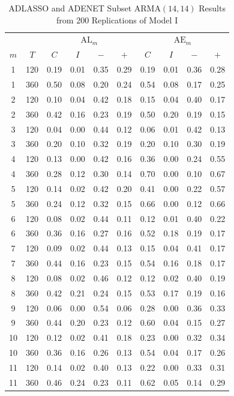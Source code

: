 \begin{table}[ht!]
\footnotesize
\centering
\caption{ADLASSO and ADENET Subset ARMA$(14,14)$ Results from 200 Replications of Model I}
\begin{tabular}{cc|cccc|cccc}
  \hline
  & & \multicolumn{4}{c|}{$\textrm{AL}_m$} & \multicolumn{4}{c}{$\textrm{AE}_m$} \\
  \cline{4-5}  \cline{8-9}
  $m$ & $T$ & $C$ & $I$ & $-$ & $+$ & $C$ & $I$ & $-$ & $+$ \\
  \hline
  1 & 120 & 0.19 & 0.01 & 0.35 & 0.29 & 0.19 & 0.01 & 0.36 & 0.28 \\ 
  1 & 360 & 0.50 & 0.08 & 0.20 & 0.24 & 0.54 & 0.08 & 0.17 & 0.25 \\ 
  2 & 120 & 0.10 & 0.04 & 0.42 & 0.18 & 0.15 & 0.04 & 0.40 & 0.17 \\ 
  2 & 360 & 0.42 & 0.16 & 0.23 & 0.19 & 0.50 & 0.20 & 0.19 & 0.15 \\ 
  3 & 120 & 0.04 & 0.00 & 0.44 & 0.12 & 0.06 & 0.01 & 0.42 & 0.13 \\ 
  3 & 360 & 0.20 & 0.10 & 0.32 & 0.19 & 0.20 & 0.10 & 0.30 & 0.19 \\
  	\hline 
  4 & 120 & 0.13 & 0.00 & 0.42 & 0.16 & 0.36 & 0.00 & 0.24 & 0.55 \\ 
  4 & 360 & 0.28 & 0.12 & 0.30 & 0.14 & 0.70 & 0.00 & 0.10 & 0.67 \\ 
  5 & 120 & 0.14 & 0.02 & 0.42 & 0.20 & 0.41 & 0.00 & 0.22 & 0.57 \\ 
  5 & 360 & 0.24 & 0.12 & 0.32 & 0.15 & 0.66 & 0.00 & 0.12 & 0.66 \\ 
  \hline
  6 & 120 & 0.08 & 0.02 & 0.44 & 0.11 & 0.12 & 0.01 & 0.40 & 0.22 \\ 
  6 & 360 & 0.36 & 0.16 & 0.27 & 0.16 & 0.52 & 0.18 & 0.19 & 0.17 \\ 
  7 & 120 & 0.09 & 0.02 & 0.44 & 0.13 & 0.15 & 0.04 & 0.41 & 0.17 \\ 
  7 & 360 & 0.44 & 0.16 & 0.23 & 0.15 & 0.54 & 0.16 & 0.18 & 0.17 \\ 
  8 & 120 & 0.08 & 0.02 & 0.46 & 0.12 & 0.12 & 0.02 & 0.40 & 0.19 \\ 
  8 & 360 & 0.42 & 0.21 & 0.24 & 0.15 & 0.53 & 0.17 & 0.19 & 0.16 \\ 
  \hline
  9 & 120 & 0.06 & 0.00 & 0.54 & 0.06 & 0.28 & 0.00 & 0.36 & 0.33 \\ 
  9 & 360 & 0.44 & 0.20 & 0.23 & 0.12 & 0.60 & 0.04 & 0.15 & 0.27 \\ 
  10 & 120 & 0.12 & 0.02 & 0.41 & 0.18 & 0.23 & 0.00 & 0.32 & 0.34 \\ 
  10 & 360 & 0.36 & 0.16 & 0.26 & 0.13 & 0.54 & 0.04 & 0.17 & 0.26 \\ 
  11 & 120 & 0.14 & 0.02 & 0.40 & 0.13 & 0.22 & 0.00 & 0.33 & 0.31 \\ 
  11 & 360 & 0.46 & 0.24 & 0.23 & 0.11 & 0.62 & 0.05 & 0.14 & 0.29 \\ 
   \hline
\end{tabular}
\label{tab:alaemod1}
\end{table}

